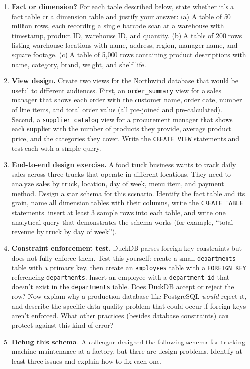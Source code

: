 \documentclass[
  letterpaper,
  DIV=11,
  numbers=noendperiod]{scrreprt}
\begin{document}
\begin{enumerate}
  Identify the redundancy, describe the anomalies that could occur, and
  design a normalized schema (at least three tables). Write the
  \texttt{CREATE\ TABLE} statements and explain how your design prevents
  each anomaly.
\item
  \textbf{Fact or dimension?} For each table described below, state
  whether it's a fact table or a dimension table and justify your
  answer: (a) A table of 50 million rows, each recording a single
  barcode scan at a warehouse with timestamp, product ID, warehouse ID,
  and quantity. (b) A table of 200 rows listing warehouse locations with
  name, address, region, manager name, and square footage. (c) A table
  of 5,000 rows containing product descriptions with name, category,
  brand, weight, and shelf life.
\item
  \textbf{View design.} Create two views for the Northwind database that
  would be useful to different audiences. First, an
  \texttt{order\_summary} view for a sales manager that shows each order
  with the customer name, order date, number of line items, and total
  order value (all pre-joined and pre-calculated). Second, a
  \texttt{supplier\_catalog} view for a procurement manager that shows
  each supplier with the number of products they provide, average
  product price, and the categories they cover. Write the
  \texttt{CREATE\ VIEW} statements and test each with a simple query.
\item
  \textbf{End-to-end design exercise.} A food truck business wants to
  track daily sales across three trucks that operate in different
  locations. They need to analyze sales by truck, location, day of week,
  menu item, and payment method. Design a star schema for this scenario.
  Identify the fact table and its grain, name all dimension tables with
  their columns, write the \texttt{CREATE\ TABLE} statements, insert at
  least 3 sample rows into each table, and write one analytical query
  that demonstrates the schema works (for example, ``total revenue by
  truck by day of week'').
\item
  \textbf{Constraint enforcement test.} DuckDB parses foreign key
  constraints but does not fully enforce them. Test this yourself:
  create a small \texttt{departments} table with a primary key, then
  create an \texttt{employees} table with a \texttt{FOREIGN\ KEY}
  referencing \texttt{departments}. Insert an employee with a
  \texttt{department\_id} that doesn't exist in the \texttt{departments}
  table. Does DuckDB accept or reject the row? Now explain why a
  production database like PostgreSQL \emph{would} reject it, and
  describe the specific data quality problem that could occur if foreign
  keys aren't enforced. What other practices (besides database
  constraints) can protect against this kind of error?
\item
  \textbf{Debug this schema.} A colleague designed the following schema
  for tracking machine maintenance at a factory, but there are design
  problems. Identify at least three issues and explain how to fix each
  one.


\end{enumerate}
\end{document}
